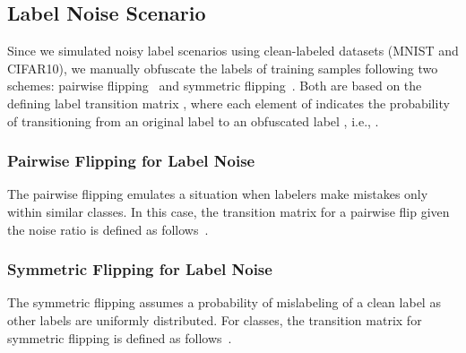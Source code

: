\documentclass[sigconf]{acmart}
\begin{document}
\subsection{Label Noise Scenario}
Since we simulated noisy label scenarios using clean-labeled datasets (MNIST and CIFAR10), we manually obfuscate the labels of training samples following two schemes: pairwise flipping~\cite{pair} and symmetric flipping~\cite{symm}. Both are based on the defining label transition matrix , where each element of  indicates the probability of transitioning from an original label  to an obfuscated label , i.e., . 

\subsubsection{Pairwise Flipping for Label Noise}
The pairwise flipping emulates a situation when labelers make mistakes only within similar classes. In this case, the transition matrix  for a pairwise flip given the noise ratio  is defined as follows~\cite{pair}.


\subsubsection{Symmetric Flipping for Label Noise}
The symmetric flipping assumes a probability of mislabeling of a clean label as other labels are uniformly distributed. For  classes, the transition matrix for symmetric flipping is defined as follows~\cite{symm}.
 \\
\end{document}
